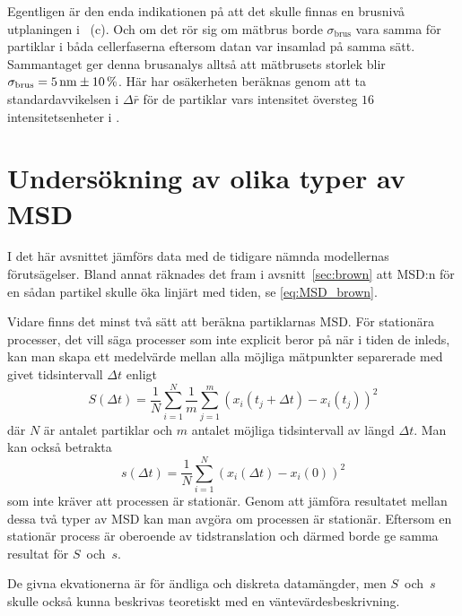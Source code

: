 Egentligen är den enda indikationen på att det skulle finnas en brusnivå utplaningen\footnotemark{} i ~(c). Och om det rör sig om mätbrus borde $\sigma_\text{brus}$ vara samma för partiklar i båda cellerfaserna eftersom datan var insamlad på samma sätt. Sammantaget ger denna brusanalys alltså att mätbrusets storlek blir $\sigma_\text{brus}=\unit[5]{nm} \pm 10\,\%$. Här har osäkerheten beräknas genom att ta standardavvikelsen i $\Delta\bar{r}$ för de partiklar vars intensitet översteg $16$\,intensitetsenheter i .





\section{Undersökning av olika typer av MSD}

I det här avsnittet jämförs data med de tidigare nämnda modellernas förutsägelser. Bland annat räknades det fram i avsnitt~\ref{sec:brown} att MSD:n för en sådan partikel skulle öka linjärt med tiden, se \eqref{eq:MSD_brown}.

Vidare finns det minst två sätt att beräkna partiklarnas MSD. För stationära processer, det vill säga processer som inte explicit beror på när i tiden de inleds, kan man skapa ett medelvärde mellan alla möjliga mätpunkter separerade med givet tidsintervall $\Delta{t}$ enligt
\begin{equation} \label{eq:MSD_S}
    S(\Delta t)= \frac{1}{N}\sum^N_{i=1}\frac{1}{m}\sum^m_{j=1}(x_i(t_j+\Delta t)-x_i(t_j))^2
\end{equation} 
där $N$ är antalet partiklar och $m$ antalet möjliga tidsintervall av längd $\Delta t$. 
Man kan också betrakta
\begin{equation} \label{eq:MSD_s}%
    s(\Delta t)= \frac{1}{N}\sum^N_{i=1}(x_i(\Delta t)-x_i(0))^2
\end{equation} 
som inte kräver att processen är stationär.
Genom att jämföra resultatet mellan dessa två typer av MSD kan man avgöra om processen är stationär. Eftersom en stationär process är oberoende av tidstranslation och därmed borde ge samma resultat för $S$~och~$s$. 

De givna ekvationerna är för ändliga och diskreta datamängder, men $S$~och~$s$ skulle också kunna beskrivas teoretiskt med en väntevärdesbeskrivning.

